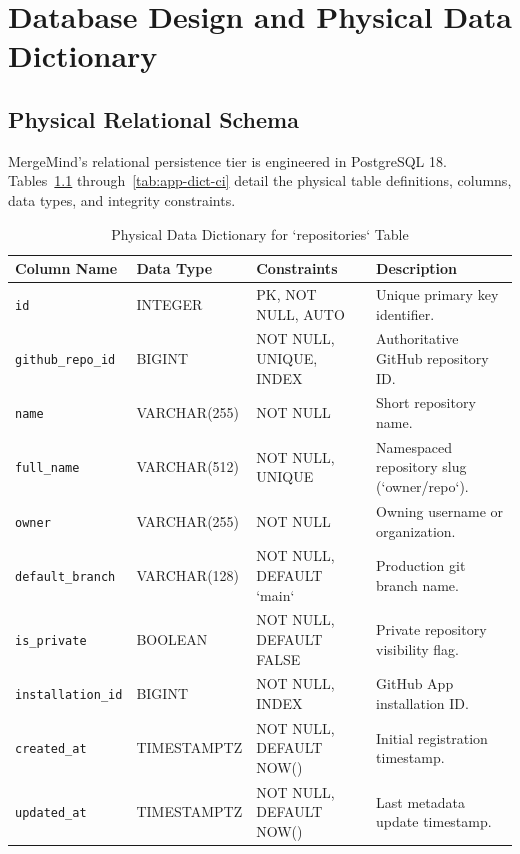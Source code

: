 \chapter{Database Design and Physical Data Dictionary}
\label{app:database-design}

\section{Physical Relational Schema}

MergeMind's relational persistence tier is engineered in PostgreSQL 18. Tables~\ref{tab:app-dict-repos} through~\ref{tab:app-dict-ci} detail the physical table definitions, columns, data types, and integrity constraints.

\begin{table}[htbp]
    \centering
    \caption{Physical Data Dictionary for `repositories` Table}
    \label{tab:app-dict-repos}
    \small
    \begin{tabularx}{\textwidth}{p{} p{} p{} p{}}
        \toprule
        \textbf{Column Name} & \textbf{Data Type} & \textbf{Constraints} & \textbf{Description} \\
        \midrule
        \texttt{id} & INTEGER & PK, NOT NULL, AUTO & Unique primary key identifier. \\
        \texttt{github\_repo\_id} & BIGINT & NOT NULL, UNIQUE, INDEX & Authoritative GitHub repository ID. \\
        \texttt{name} & VARCHAR(255) & NOT NULL & Short repository name. \\
        \texttt{full\_name} & VARCHAR(512) & NOT NULL, UNIQUE & Namespaced repository slug (`owner/repo`). \\
        \texttt{owner} & VARCHAR(255) & NOT NULL & Owning username or organization. \\
        \texttt{default\_branch} & VARCHAR(128) & NOT NULL, DEFAULT `main` & Production git branch name. \\
        \texttt{is\_private} & BOOLEAN & NOT NULL, DEFAULT FALSE & Private repository visibility flag. \\
        \texttt{installation\_id} & BIGINT & NOT NULL, INDEX & GitHub App installation ID. \\
        \texttt{created\_at} & TIMESTAMPTZ & NOT NULL, DEFAULT NOW() & Initial registration timestamp. \\
        \texttt{updated\_at} & TIMESTAMPTZ & NOT NULL, DEFAULT NOW() & Last metadata update timestamp. \\
        \bottomrule
    \end{tabularx}
\end{table}

